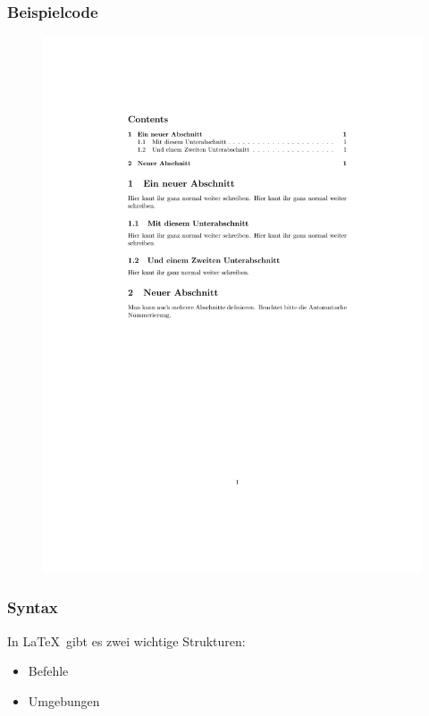\begin{frame}[fragile]
\frametitle{Beispielcode}
\vspace{-70pt}
\begin{figure}[htp]
\centering
\includegraphics[scale=.6]{Beispiele/Sections/Bsp_section.pdf}
\caption{}
\label{}
\end{figure}
\end{frame}


\begin{frame}[fragile]
\frametitle{Syntax}
\linespread{1.5}
In \LaTeX\, gibt es zwei wichtige Strukturen: \pause
\begin{itemize}[<+->]
  \item Befehle
  \item Umgebungen
\end{itemize}	

\end{frame}

